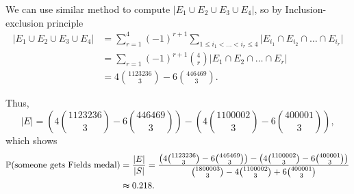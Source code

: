 \documentclass[a4paper,12pt]{article}
\begin{document}
We can use similar method to compute \(\vert E_1 \cup E_2 \cup E_3 \cup E_4  \vert \), so by Inclusion-exclusion principle
\begin{align*}
	\vert E_1 \cup E_2 \cup E_3 \cup E_4  \vert &= \sum_{r=1}^4 (-1)^{r+1} \sum_{1 \le i_1 < \dots < i_r \le 4} \vert E_{i_1} \cap E_{i_2} \cap \dots \cap E_{i_r} \vert \\
	&= \sum_{r=1} (-1)^{r+1} \binom{4}{r} \vert E_1 \cap E_2 \cap \dots \cap E_r \vert \\ 
	&= 4 \binom{1123236}{3} - 6 \binom{446469}{3}.   
\end{align*}

Thus, 
\[
	\vert E \vert = \left( 4 \binom{1123236}{3} - 6 \binom{446469}{3} \right) - \left( 4 \binom{1100002}{3} - 6 \binom{400001}{3} \right),  
\]
which shows 
\begin{align*}
	\mathbb{P} (\text{someone gets Fields medal} ) &= \frac{\vert E \vert }{\vert S \vert } = \frac{\left( 4 \binom{1123236}{3} - 6 \binom{446469}{3} \right) - \left( 4 \binom{1100002}{3} - 6 \binom{400001}{3} \right)}{\binom{1800003}{3} - 4 \binom{1100002}{3} + 6 \binom{400001}{3}} \\
	&\thickapprox 0.218.
\end{align*}




\begin{center}
\end{center}
\end{document}
